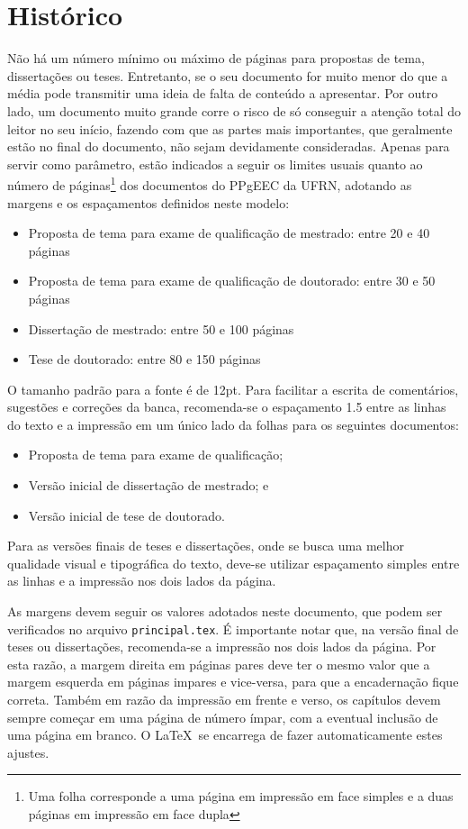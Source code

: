 \section{Histórico}
\label{Sec:historico}

Não há um número mínimo ou máximo de páginas para propostas de tema,
dissertações ou teses. Entretanto, se o seu documento for muito menor
do que a média pode transmitir uma ideia de falta de conteúdo a
apresentar. Por outro lado, um documento muito grande corre o risco de
só conseguir a atenção total do leitor no seu início, fazendo com que
as partes mais importantes, que geralmente estão no final do
documento, não sejam devidamente consideradas. Apenas para servir como
parâmetro, estão indicados a seguir os limites usuais quanto ao número
de páginas\footnote{Uma folha corresponde a uma página em impressão em
face simples e a duas páginas em impressão em face dupla} dos
documentos do PPgEEC da UFRN, adotando as margens e os espaçamentos
definidos neste modelo:
\begin{itemize}
\item Proposta de tema para exame de qualificação de mestrado:
entre 20 e 40 páginas
\item Proposta de tema para exame de qualificação de doutorado:
entre 30 e 50 páginas
\item Dissertação de mestrado:
entre 50 e 100 páginas
\item Tese de doutorado:
entre 80 e 150 páginas
\end{itemize}

O tamanho padrão para a fonte é de 12pt.  Para facilitar a escrita de
comentários, sugestões e correções da banca, recomenda-se o espaçamento
1.5 entre as linhas do texto e a impressão em um único lado da folhas
para os seguintes documentos:
\begin{itemize}
\item Proposta de tema para exame de qualificação;
\item Versão inicial de dissertação de mestrado; e
\item Versão inicial de tese de doutorado.
\end{itemize}
Para as versões finais de teses e dissertações, onde se busca uma
melhor qualidade visual e tipográfica do texto, deve-se utilizar
espaçamento simples entre as linhas e a impressão nos dois lados da
página.

As margens devem seguir os valores adotados neste documento, que podem
ser verificados no arquivo \texttt{principal.tex}. É importante notar
que, na versão final de teses ou dissertações, recomenda-se a
impressão nos dois lados da página. Por esta razão, a margem direita
em páginas pares deve ter o mesmo valor que a margem esquerda em
páginas impares e vice-versa, para que a encadernação fique
correta. Também em razão da impressão em frente e verso, os capítulos
devem sempre começar em uma página de número ímpar, com a eventual
inclusão de uma página em branco. O \LaTeX\ se encarrega de fazer
automaticamente estes ajustes.

